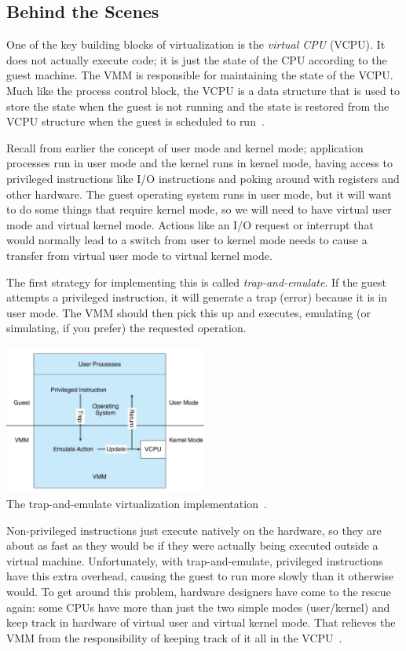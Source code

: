 \subsection*{Behind the Scenes}

One of the key building blocks of virtualization is the \textit{virtual CPU} (VCPU). It does not actually execute code; it is just the state of the CPU according to the guest machine. The VMM is responsible for maintaining the state of the VCPU. Much like the process control block, the VCPU is a data structure that is used to store the state when the guest is not running and the state is restored from the VCPU structure when the guest is scheduled to run~\cite{osc}.

Recall from earlier the concept of user mode and kernel mode; application processes run in user mode and the kernel runs in kernel mode, having access to privileged instructions like I/O instructions and poking around with registers and other hardware. The guest operating system runs in user mode, but it will want to do some things that require kernel mode, so we will need to have virtual user mode and virtual kernel mode. Actions like an I/O request or interrupt that would normally lead to a switch from user to kernel mode needs to cause a transfer from virtual user mode to virtual kernel mode.

The first strategy for implementing this is called \textit{trap-and-emulate}. If the guest attempts a privileged instruction, it will generate a trap (error) because it is in user mode. The VMM should then pick this up and executes, emulating (or simulating, if you prefer) the requested operation.

\begin{center}
	\includegraphics[width=0.5\textwidth]{images/trap-and-emulate.png}\\
	The trap-and-emulate virtualization implementation~\cite{osc}.
\end{center}

Non-privileged instructions just execute natively on the hardware, so they are about as fast as they would be if they were actually being executed outside a virtual machine. Unfortunately, with trap-and-emulate, privileged instructions have this extra overhead, causing the guest to run more slowly than it otherwise would. To get around this problem, hardware designers have come to the rescue again: some CPUs have more than just the two simple modes (user/kernel) and keep track in hardware of virtual user and virtual kernel mode. That relieves the VMM from the responsibility of keeping track of it all in the VCPU~\cite{osc}.

